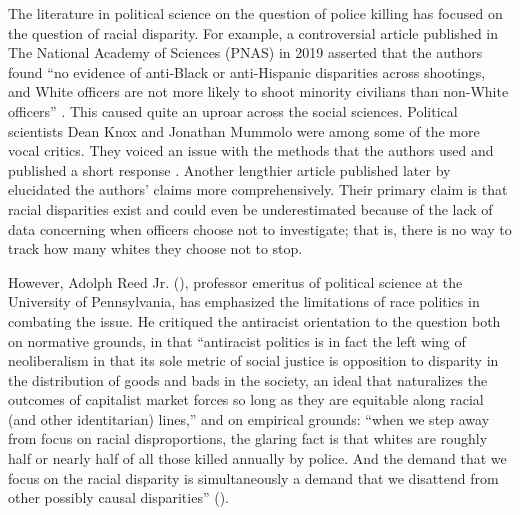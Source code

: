 \documentclass[12pt]{article}
\begin{document}
The literature in political science on the question of police killing has focused on the question of racial disparity. For example, a controversial article published in The National Academy of Sciences (PNAS) in 2019 asserted that the authors found “no evidence of anti-Black or anti-Hispanic disparities across shootings, and White officers are not more likely to shoot minority civilians than non-White officers” \parencite[15877]{johnsonOfficerCharacteristicsRacial2019}. This caused quite an uproar across the social sciences. Political scientists Dean Knox and Jonathan Mummolo were among some of the more vocal critics. They voiced an issue with the methods that the authors used and published a short response \parencite{knoxMakingInferencesRacial2020}. Another lengthier article published later by \textcite{knoxAdministrativeRecordsMask2020} elucidated the authors’ claims more comprehensively. Their primary claim is that racial disparities exist and could even be underestimated because of the lack of data concerning when officers choose not to investigate; that is, there is no way to track how many whites they choose not to stop.

However, Adolph Reed Jr. (\citeyear{reedHowRacialDisparity2016}), professor emeritus of political science at the University of Pennsylvania, has emphasized the limitations of race politics in combating the issue. He critiqued the antiracist orientation to the question both on normative grounds, in that “antiracist politics is in fact the left wing of neoliberalism in that its sole metric of social justice is opposition to disparity in the distribution of goods and bads in the society, an ideal that naturalizes the outcomes of capitalist market forces so long as they are equitable along racial (and other identitarian) lines,” and on empirical grounds: “when we step away from focus on racial disproportions, the glaring fact is that whites are roughly half or nearly half of all those killed annually by police. And the demand that we focus on the racial disparity is simultaneously a demand that we disattend from other possibly causal disparities” (\cite{reedHowRacialDisparity2016}).
\end{document}
